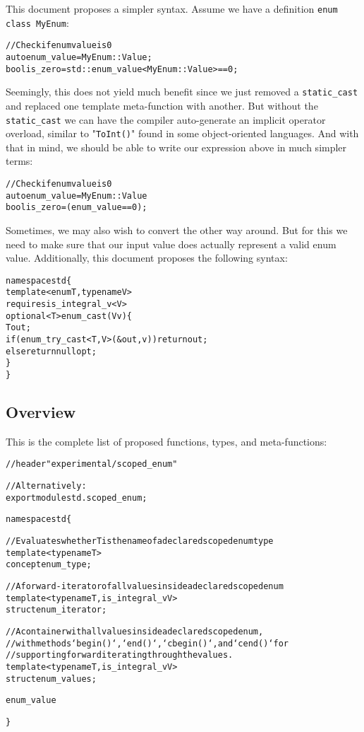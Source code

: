 \documentclass[a4paper]{article}
\begin{document}
\noindent
This document proposes a simpler syntax. Assume we have a definition
\texttt{enum class MyEnum}:

\begin{alltt}\footnotesize
// Check if enum value is 0
auto enum\_value = MyEnum::Value;
bool is\_zero = std::enum\_value<MyEnum::Value> == 0;
\end{alltt}

\noindent
Seemingly, this does not yield much benefit since we just removed a
\texttt{static\_cast} and replaced one template meta-function with another.
But without the \texttt{static\_cast} we can have the compiler auto-generate
an implicit operator overload, similar to "\texttt{ToInt()}" found in some
object-oriented languages. And with that in mind, we should be able to write
our expression above in much simpler terms:

\begin{alltt}\footnotesize
// Check if enum value is 0
auto enum\_value = MyEnum::Value
bool is\_zero = (enum\_value == 0);
\end{alltt}

\noindent
Sometimes, we may also wish to convert the other way around. But for this
we need to make sure that our input value does actually represent a valid
enum value. Additionally, this document proposes the following syntax:

\begin{alltt}\footnotesize
namespace std \{
  template<enum T, typename V>
  requires is\_integral\_v<V>
  optional<T> enum\_cast(V v) \{
    T out;
    if (enum\_try\_cast<T, V>(&out, v)) return out;
    else return nullopt;
  \}
\}
\end{alltt}


\subsection{Overview}

This is the complete list of proposed functions, types, and meta-functions:

\begin{alltt}\footnotesize
// header "experimental/scoped\_enum"

// Alternatively:
export module std.scoped\_enum;

namespace std \{

  // Evaluates whether T is the name of a declared scoped enum type
  template<typename T>
  concept enum\_type;

  // A forward-iterator of all values inside a declared scoped enum
  template<typename T, is\_integral\_v V>
  struct enum\_iterator;

  // A container with all values inside a declared scoped enum,
  // with methods `begin()`, `end()`, `cbegin()`, and `cend()` for
  // supporting forward iterating through the values.
  template<typename T, is\_integral\_v V>
  struct enum\_values;

  enum\_value



\}
\end{alltt}
\end{document}
